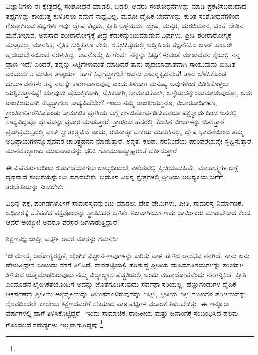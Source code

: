ವಿಜ್ಞಾನಿಗಳು ಈ ಕ್ಷೇತ್ರದಲ್ಲಿ ಸಂಶೋಧನೆ ಮಾಡಲಿ, ಬಿಡಲಿ! ಅವರು ಸಂಶೋಧನೆಗಳನ್ನು ಮಾಡಿ ಪ್ರಕಟಿಸಬಹುದಾದ ತಥ್ಯಗಳನ್ನು ಕಾಯುತ್ತ ಕುಳಿತಿರಲು ನಮಗೆ ಸಾಧ್ಯವಿಲ್ಲ. ಮನೋ ದೈಹಿಕ ಬೇನೆಗಳನ್ನು ಕುರಿತ ಸಂಶೋಧನೆಗಳಿಂದ ಗೊತ್ತಾಗಿರುವ ತಥ್ಯಗಳು ಇವು: ದ್ವೇಷ ಕೆಟ್ಟದು, ಪ್ರೀತಿ ಒಳ್ಳೆಯದು. ದ್ವೇಷ, ಮತ್ಸರ, ದುರಭಿಮಾನ, ಚಿಂತೆ, ಸೇಡಿನ ಮನೋಭಾವ, ಅವಸಾದ ಶರೀರಾರೋಗ್ಯಕ್ಕೆ ತೀವ್ರ ಕೆಡುಕನ್ನುಂಟುಮಾಡುವ ವಿಷಗಳು. ಪ್ರೀತಿ ಶರೀರಾರೋಗ್ಯಕ್ಕೆ ಮಾತ್ರವಲ್ಲ, ಮಾನಸಿಕ, ನೈತಿಕ ಸುಸ್ಥಿತಿಗೂ ಬೇಕು. ಶಸ್ತ್ರಚಿಕಿತ್ಸೆಯಲ್ಲಿ ಅದ್ವಿತೀಯ ತಜ್ಞನೆನಿಸಿದ ಜಾನ್ ಹಂಟರ್ ಹೃದಯಬೇನೆಯಿಂದ ನರಳುತ್ತಿದ್ದ. ಅವನೊಮ್ಮೆ ಹೀಗೆಂದ: ‘ನನ್ನನ್ನು ಸಿಟ್ಟಿಗೇಳುವಂತೆ ಮಾಡುವವನ ಕೈಯಲ್ಲಿ ನನ್ನ ಪ್ರಾಣ ಇದೆ.’ ಎಂದರೆ, ತನ್ನನ್ನು ಸಿಟ್ಟಿಗೇಳುವಂತೆ ಮಾಡಿದರೆ ತಾನು ಹೃದಯಾಘಾತವಾಗಿ ಸಾಯುವುದು ಖಂಡಿತ ಎಂಬುದು ಆ ಮಾತಿನ ತಾತ್ಪರ್ಯ. ಹಾಗೆ ಸಿಟ್ಟಿಗೆದ್ದಾಗಲೇ ಅವನು ಸಾವನ್ನಪ್ಪಿದನಂತೆ! ತಾನು ಬೆಳೆಸಿಕೊಂಡ ದುರ್ಭಾವನೆಗಳು ತನ್ನ ನಾಶಕ್ಕೇ ಕಾರಣವಾಗುವುವು ಎಂದು ತಿಳಿದಾಗ ಮನುಷ್ಯ ಅವುಗಳಿಂದ ಬಿಡಿಸಿಕೊಳ್ಳಲು ಯತ್ನಿಸುತ್ತಾನಷ್ಟೆ! ಯಾವುದು ವೈಯಕ್ತಿಕವಾಗಿ, ನೈತಿಕವಾಗಿ, ಸಾಮಾಜಿಕವಾಗಿ, ಒಳ್ಳೆಯದನ್ನುಂಟುಮಾಡುವುದೋ, ಅದು ರಾಜಕೀಯವಾಗಿ ಕೆಟ್ಟದ್ದಾಗಲು ಸಾಧ್ಯವಿದೆಯೇ? ಇಂದು ನಮ್ಮ ರಾಜಕೀಯಸ್ಥರೂ, ವಿಚಾರವಾದಿಗಳೂ, ಕ್ರಾಂತಿಕಾರಿಗಳೆನಿಸಿಕೊಂಡು ಸಾಮಾಜಿಕ ಪ್ರಗತಿಯ ಬಗ್ಗೆ ಕಾಳಜಿ\break ತೋರ್ಪಡಿಸುವವರೂ ಪಕ್ಷಸ್ವಾರ್ಥದಿಂದ ಜನರಲ್ಲಿ ಸಾಧ್ಯವಿದ್ದಷ್ಟೂ ದ್ವೇಷವನ್ನು ಪ್ರಚಾರ ಮಾಡು\-ತ್ತಾರೆ. ಕ್ರಾಂತಿಯ ಹೆಸರಲ್ಲಿ ಕೆಡುಕಿನ ಬೀಜಗಳನ್ನು ಬಿತ್ತುತ್ತಾರೆ. ಪ್ರಜಾಪ್ರಭುತ್ವದಲ್ಲಿ ವಾಕ್ ಸ್ವಾತಂತ್ರ್ಯವಿದೆ ಎಂದು, ರಚನಾತ್ಮಕ ಟೀಕೆಯ ಮುಸುಕಿನಲ್ಲಿ, ದ್ವೇಷ ಭಾವನೆಯಿಂದ ತಮ್ಮ ಅಭಿಪ್ರಾಯಗಳನ್ನೊಪ್ಪದವರ ಚಾರಿತ್ರ್ಯಹನನ ಮಾಡುತ್ತಾರೆ. ಅನೃತ, ಕಲಹ, ಪರನಿಂದೆಯ ಪರಂಪರೆಯನ್ನೇ ಸೃಷ್ಟಿಸುತ್ತಾರೆ. ಮಾನವಕಲ್ಯಾಣದ ಮುಖವಾಡವನ್ನು ಧರಿಸಿ ಗೋಮುಖ\-ವ್ಯಾಘ್ರರಂತೆ ವರ್ತಿಸುತ್ತಾರೆ.

ಈ ವಿಷವರ್ತುಲದಿಂದ ಬಿಡುಗಡೆಯಾಗಲು ಬಾಲ್ಯದಿಂದಲೇ ಎಳೆಯರಲ್ಲಿ ಪ್ರೀತಿಯ\break ಮಹಿಮೆ, ಮಾಹಾತ್ಮ್ಯಗಳ ಬಗ್ಗೆ ದೃಢವಾದ ನಂಬಿಕೆಯನ್ನುಂಟು ಮಾಡಬೇಕು. ಬದುಕಿನ ವಿಭಿನ್ನ ಕ್ಷೇತ್ರಗಳಲ್ಲಿ ಪ್ರೀತಿಯ ಅಭಿವ್ಯಕ್ತಿಯ ಬಗೆಗೆ ತರಬೇತಿಯನ್ನು ನೀಡಬೇಕು.

\newpage

ವಿಭಿನ್ನ ಪಕ್ಷ, ಪಂಗಡಗಳೊಳಗೆ ಸಾಮರಸ್ಯವನ್ನುಂಟು ಮಾಡಲು ದೇಶ ಪ್ರೇಮಿಗಳು, ಪ್ರೀತಿ, ಸಾಮರಸ್ಯ ನಿರ್ಮಾಣಕ್ಕೆ, ಅಧಿಕಾರಕ್ಕೆ ಆಸೆಪಡೆದ ಪಕ್ಷವೊಂದನ್ನು ಸ್ಥಾಪಿಸಿದರೆ ಒಳಿತು. ನಿಜವಾಗಿಯೂ ಇದು ಧಾರ್ಮಿಕರು ಮಾಡಬೇಕಾದ ಕೆಲಸ. ಆದರೆ ಅಯ್ಯೋ! ಅವರೂ ಪರಸ್ಪರ ಜಗಳಾಡುತ್ತಿದ್ದಾರೆ!

ಶಿಕ್ಷಣತಜ್ಞ ಜಾಫ್ರೀ ಫರ್ಸ್ಟ್ ಅವರ ಮಾತನ್ನು ಗಮನಿಸಿ:

‘ಜೀವಶಾಸ್ತ್ರ, ಆರೋಗ್ಯರಕ್ಷಣೆ, ಲೈಂಗಿಕ ವಿಜ್ಞಾನ–ಇವುಗಳನ್ನು ಕುರಿತು ಪಾಠ ಹೇಳಿದ ಅನುಭವ ನನಗಿದೆ. ನಾನು ಏನು ಹೇಳುತ್ತಿದ್ದೇನೆ ಎಂಬುದು ನನಗೆ ತಿಳಿದಿದೆ. ಪಾಠಪಟ್ಟಿಯಲ್ಲಿ ಪರಿಶುದ್ಧ ಪ್ರೀತಿಯ ಮಹಿಮಾತಿಶಯಗಳನ್ನು ಸರಿಯಾಗಿ ತಿಳಿಸುವ ಯತ್ನಮಾಡದಿರುವುದು ನಮ್ಮ ವಿದ್ಯಾಭ್ಯಾಸ ಪದ್ಧತಿಯಲ್ಲಿ ಒಂದು ಮಹಾದೋಷವೆಂದು ನನಗನ್ನಿಸಿದೆ. ಪ್ರೀತಿ ಎಂದೊಡನೆ ಲೈಂಗಿಕತೆಯೊಂದಿಗೆ ಅದನ್ನು ಜೊತೆಗೂಡಿಸುವುದು ಸರ್ವಥಾ ಸರಿಯಲ್ಲ. ಹೆಣ್ಣುಗಂಡುಗಳ ದೈಹಿಕ ಆಕರ್ಷಣೆಗೇ ಪ್ರೀತಿಯ ಅಭಿವ್ಯಕ್ತಿಯನ್ನು ಸೀಮಿತಗೊಳಿಸುವುದನ್ನು ಬಿಟ್ಟು, ಪ್ರೀತಿಯ ಎಲ್ಲ ಮುಖಗಳ ಪರಿಚಯವನ್ನು ಶೈಶವದಿಂದಲೇ ಕಾಲೇಜು ಶಿಕ್ಷಣದವರೆಗೆ ಸರಿಯಾದ ಪಾಠ ಪಟ್ಟಿಗಳ ಮೂಲಕ ತಿಳಿಸಬೇಕಿತ್ತು. ಈ ಇನ್ನೂರು ವರ್ಷಗಳಲ್ಲಿ ಹಾಗೆ ತಿಳಿಸಿಕೊಟ್ಟಿದ್ದರೆ– ಇಂದು ಸಾಮಾಜಿಕ, ರಾಜಕೀಯ ಮತ್ತು ಜನಾಂಗಕ್ಕೆ ಸಂಬಂಧಿಸಿದ ಹಲವು ಗೊಂದಲದ ಸಮಸ್ಯೆಗಳು ಇಲ್ಲವಾಗುತ್ತಿದ್ದವು.’\footnote{}


